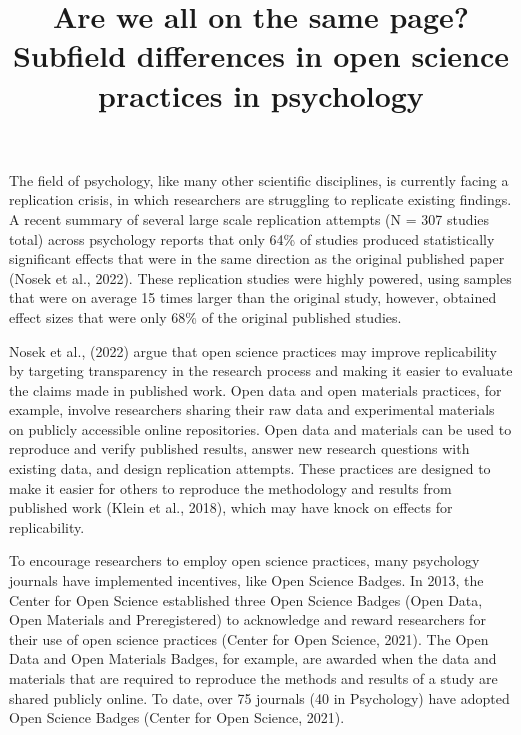 \documentclass[
  english,
  man,floatsintext]{apa6}
\title{Are we all on the same page? Subfield differences in open science practices in psychology}
\author{\phantom{0}}
\date{}
\affiliation{\phantom{0}}
\begin{document}
\maketitle

The field of psychology, like many other scientific disciplines, is currently facing a replication crisis, in which researchers are struggling to replicate existing findings. A recent summary of several large scale replication attempts (N = 307 studies total) across psychology reports that only 64\% of studies produced statistically significant effects that were in the same direction as the original published paper (Nosek et al., 2022). These replication studies were highly powered, using samples that were on average 15 times larger than the original study, however, obtained effect sizes that were only 68\% of the original published studies.

Nosek et al., (2022) argue that open science practices may improve replicability by targeting transparency in the research process and making it easier to evaluate the claims made in published work. Open data and open materials practices, for example, involve researchers sharing their raw data and experimental materials on publicly accessible online repositories. Open data and materials can be used to reproduce and verify published results, answer new research questions with existing data, and design replication attempts. These practices are designed to make it easier for others to reproduce the methodology and results from published work (Klein et al., 2018), which may have knock on effects for replicability.

To encourage researchers to employ open science practices, many psychology journals have implemented incentives, like Open Science Badges. In 2013, the Center for Open Science established three Open Science Badges (Open Data, Open Materials and Preregistered) to acknowledge and reward researchers for their use of open science practices (Center for Open Science, 2021). The Open Data and Open Materials Badges, for example, are awarded when the data and materials that are required to reproduce the methods and results of a study are shared publicly online. To date, over 75 journals (40 in Psychology) have adopted Open Science Badges (Center for Open Science, 2021).
\end{document}
